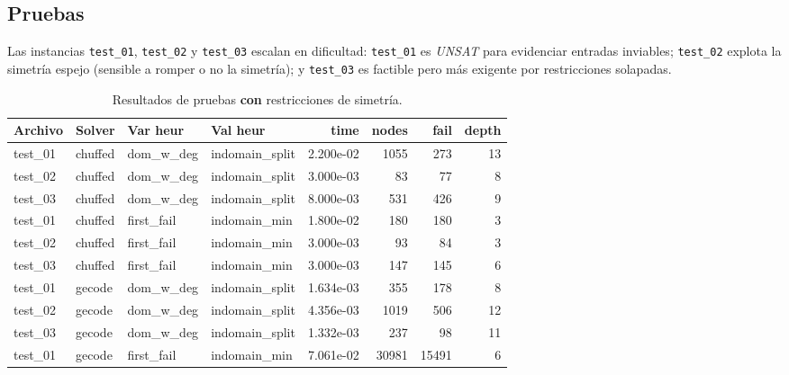
\subsection{Pruebas}\label{sec:05-reunion-pruebas}
Las instancias \texttt{test\_01}, \texttt{test\_02} y \texttt{test\_03} escalan en dificultad: \texttt{test\_01} es \emph{UNSAT} para evidenciar entradas inviables; \texttt{test\_02} explota la simetría espejo (sensible a romper o no la simetría); y \texttt{test\_03} es factible pero más exigente por restricciones solapadas.

\begin{compactfloats}
  \begin{table}[H]
    \centering
    \small
    \setlength{\tabcolsep}{1.8pt}
    \caption{Resultados de pruebas \textbf{con} restricciones de simetría.}
    \label{tab:pruebas-reunion-on}
    \begin{tabular}{l l l l r r r r}
      \toprule
      \textbf{Archivo} & \textbf{Solver} & \textbf{Var heur} & \textbf{Val heur} & \textbf{time} & \textbf{nodes} & \textbf{fail} & \textbf{depth} \\
      \midrule
      test\_01 & chuffed & dom\_w\_deg  & indomain\_split & 2.200e-02 &  1055 &  273 & 13 \\
      test\_02 & chuffed & dom\_w\_deg  & indomain\_split & 3.000e-03 &    83 &   77 &  8 \\
      test\_03 & chuffed & dom\_w\_deg  & indomain\_split & 8.000e-03 &   531 &  426 &  9 \\
      \midrule
      test\_01 & chuffed & first\_fail  & indomain\_min   & 1.800e-02 &   180 &  180 &  3 \\
      test\_02 & chuffed & first\_fail  & indomain\_min   & 3.000e-03 &    93 &   84 &  3 \\
      test\_03 & chuffed & first\_fail  & indomain\_min   & 3.000e-03 &   147 &  145 &  6 \\
      \midrule
      test\_01 & gecode  & dom\_w\_deg  & indomain\_split & 1.634e-03 &   355 &  178 &  8 \\
      test\_02 & gecode  & dom\_w\_deg  & indomain\_split & 4.356e-03 &  1019 &  506 & 12 \\
      test\_03 & gecode  & dom\_w\_deg  & indomain\_split & 1.332e-03 &   237 &   98 & 11 \\
      \midrule
      test\_01 & gecode  & first\_fail  & indomain\_min   & 7.061e-02 & 30981 & 15491 &  6 \\

\end{tabular}
\end{table}
\end{compactfloats}

